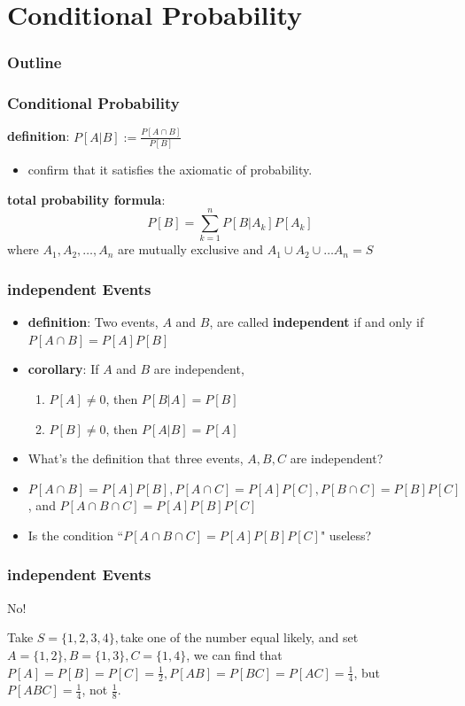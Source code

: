 \documentclass{beamer}
\begin{document}
\section{Conditional Probability}
\begin{frame}
    \frametitle{Outline}
    \tableofcontents[currentsection]
\end{frame}
\begin{frame}
    \frametitle{Conditional Probability}
    \textbf{definition}: $P[A|B]:=\frac{P[A\cap B]}{P[B]}$
    \begin{itemize}
        \item confirm that it satisfies the axiomatic of probability.
    \end{itemize}
    \textbf{total probability formula}:
    \[P[B]=\sum\limits_{k=1}^n P[B|A_k]P[A_k]\]
    where $A_1, A_2,\dots, A_n$ are mutually exclusive and $A_1\cup A_2\cup \dots A_n=S$
\end{frame}

\begin{frame}
    \frametitle{independent Events}
    \begin{itemize}
        \item \textbf{definition}: Two events, $A$ and $B$, are called \textbf{independent} if and only if $P[A\cap B]=P[A]P[B]$
        \item \textbf{corollary}: If $A$ and $B$ are independent, 
        \begin{enumerate}
            \item $P[A]\neq 0$, then $P[B|A]=P[B]$
            \item $P[B]\neq 0$, then $P[A|B]=P[A]$
        \end{enumerate}
        \item What's the definition that three events, $A,B,C$ are independent?
        \item<2-> $P[A\cap B]=P[A]P[B], P[A\cap C]=P[A]P[C],P[B\cap C]=P[B]P[C]$, and $P[A\cap B\cap C]=P[A]P[B]P[C]$
        \item<2-> Is the condition ``$P[A\cap B\cap C]=P[A]P[B]P[C]$" useless?

    \end{itemize}
    
\end{frame}

\begin{frame}
    \frametitle{independent Events}
    No!\par
    Take $S=\{1,2,3,4\}, $take one of the number equal likely, and set $A=\{1,2\}, B=\{1,3\}, C=\{1,4\}$,  we can find that $P[A]=P[B]=P[C]=\frac{1}{2}, P[AB]=P[BC]=P[AC]=\frac{1}{4}$, but $P[ABC]=\frac{1}{4}$, not $\frac{1}{8}$.
\end{frame}
\end{document}
